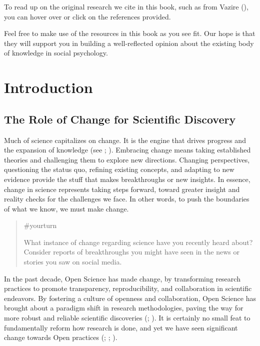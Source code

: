 \documentclass[
  letterpaper,
]{book}
\begin{document}
To read up on the original research we cite in this book, such as from
Vazire (), you can hover over or click on
the references provided.

Feel free to make use of the resources in this book as you see fit. Our
hope is that they will support you in building a well-reflected opinion
about the existing body of knowledge in social psychology.


\chapter*{\texorpdfstring{{Introduction}}{Introduction}}\label{introduction}


\section*{The Role of Change for Scientific
Discovery}\label{the-role-of-change-for-scientific-discovery}


Much of science capitalizes on change. It is the engine that drives
progress and the expansion of knowledge (see
;
). Embracing change means
taking established theories and challenging them to explore new
directions. Changing perspectives, questioning the status quo, refining
existing concepts, and adapting to new evidence provide the stuff that
makes breakthroughs or new insights. In essence, change in science
represents taking steps forward, toward greater insight and reality
checks for the challenges we face. In other words, to push the
boundaries of what we know, we must make change.

\begin{quote}
{\#yourturn}

What instance of change regarding science have you recently heard about?
Consider reports of breakthroughs you might have seen in the news or
stories you saw on social media.
\end{quote}

In the past decade, Open Science has made change, by transforming
research practices to promote transparency, reproducibility, and
collaboration in scientific endeavors. By fostering a culture of
openness and collaboration, Open Science has brought about a paradigm
shift in research methodologies, paving the way for more robust and
reliable scientific discoveries
(;
). It is certainly no small feat to fundamentally reform how
research is done, and yet we have seen significant change towards Open
practices (;
;
).
\end{document}
